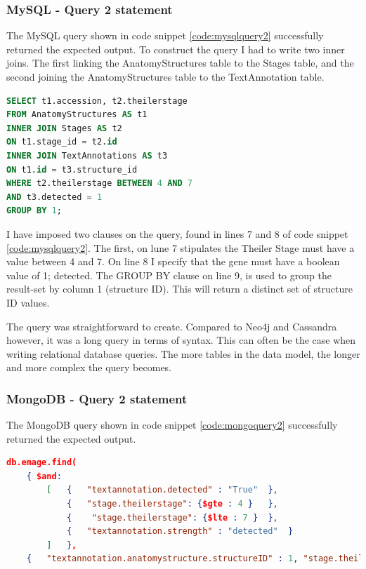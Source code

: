 \subsubsection*{MySQL - Query 2 statement}\label{mysqlquery2statement}
The MySQL query shown in code snippet \ref{code:mysqlquery2} successfully returned the expected output. To construct the query I had to write two inner joins. The first linking the AnatomyStructures table to the Stages table, and the second joining the AnatomyStructures table to the TextAnnotation table.

\begin{lstlisting}[language=SQL, caption=MySQL query 2 statement. All structures between Theiler Stage X and Y., label=code:mysqlquery2]
SELECT t1.accession, t2.theilerstage
FROM AnatomyStructures AS t1
INNER JOIN Stages AS t2
ON t1.stage_id = t2.id
INNER JOIN TextAnnotations AS t3
ON t1.id = t3.structure_id
WHERE t2.theilerstage BETWEEN 4 AND 7
AND t3.detected = 1
GROUP BY 1;
\end{lstlisting}

I have imposed two clauses on the query, found in lines 7 and 8 of code snippet \ref{code:mysqlquery2}. The first, on lune 7 stipulates the Theiler Stage must have a value between 4 and 7. On line 8 I specify that the gene must have a boolean value of 1; detected. The GROUP BY clause on line 9, is used to group the result-set by column 1 (structure ID). This will return a distinct set of structure ID values.

The query was straightforward to create. Compared to Neo4j and Cassandra however, it was a long query in terms of syntax. This can often be the case when writing relational database queries. The more tables in the data model, the longer and more complex the query becomes.

\subsubsection*{MongoDB - Query 2 statement}\label{mongoquery2statement}
The MongoDB query shown in code snippet \ref{code:mongoquery2} successfully returned the expected output.

\parindent 0pt
\begin{lstlisting}[language=json, caption=MongoDB query 2 statement. All structures between Theiler Stage X and Y., label=code:mongoquery2]
db.emage.find(
	{ $and:
		[	{	"textannotation.detected" : "True"	},
			{	"stage.theilerstage": {$gte : 4 }	},
			{	 "stage.theilerstage": {$lte : 7 }	},
			{	"textannotation.strength" : "detected"	}
		]	},
	{	"textannotation.anatomystructure.structureID" : 1, "stage.theilerstage" : 1, "_id" : 0	}	).pretty();
\end{lstlisting}

